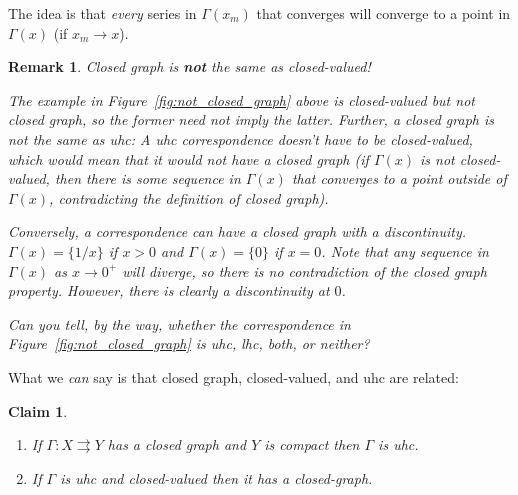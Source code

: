 \documentclass{article}
\newcommand{\toto}{\rightrightarrows}
\theoremstyle{mythm}
\newtheorem{claim}{Claim}
\theoremstyle{mydef}
\newtheorem{remark}{Remark}
\begin{document}
The idea is that \textit{every} series in $\Gamma(x_m)$ that converges will converge to a point in $\Gamma(x)$ (if $x_m \to x$).
\begin{remark}
  Closed graph is \textbf{not} the same as closed-valued!

  The example in Figure~\ref{fig:not_closed_graph} above is closed-valued but not closed graph, so the former need not imply the latter. Further, a closed graph is not the same as uhc: A uhc correspondence doesn't have to be closed-valued, which would mean that it would not have a closed graph (if $\Gamma(x)$ is not closed-valued, then there is some sequence in $\Gamma(x)$ that converges to a point outside of $\Gamma(x)$, contradicting the definition of closed graph).

  Conversely, a correspondence can have a closed graph with a discontinuity. $\Gamma(x) = \{1/x\}$ if $x > 0$ and $\Gamma(x) = \{0\}$ if $x = 0$. Note that any sequence in $\Gamma(x)$ as $x \to 0^+$ will diverge, so there is no contradiction of the closed graph property. However, there is clearly a discontinuity at $0$.


  Can you tell, by the way, whether the correspondence in Figure~\ref{fig:not_closed_graph} is uhc, lhc, both, or neither?
\end{remark}

What we \textit{can} say is that closed graph, closed-valued, and uhc are related:
\begin{claim}
  \begin{enumerate}
    \item If $\Gamma: X \toto Y$ has a closed graph and $Y$ is compact then $\Gamma$ is uhc.

    \item If $\Gamma$ is uhc and closed-valued then it has a closed-graph.
  \end{enumerate}
\end{claim}
\end{document}
